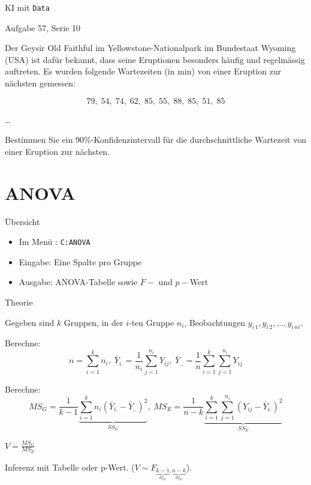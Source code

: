 \documentclass[handout]{beamer}
\newlength{\tikey}
\newcommand{\keystroke}[1]{\settowidth{\tikey}{\scriptsize #1}\psframebox[framearc=0.2]{\parbox{\tikey}{\scriptsize #1}}}
\begin{document}
\begin{frame}{KI mit \texttt{Data}}
\begin{beamerboxesrounded}[shadow]{Aufgabe 57, Serie 10}

Der Geysir Old Faithful im Yellowstone-Nationalpark im Bundestaat Wyoming (USA)
ist dafür bekannt, dass seine Eruptionen besonders häufig und regelmässig
auftreten. Es wurden folgende Wartezeiten (in min) von einer Eruption zur
nächsten gemessen:

$$
79,\; 54,\; 74,\; 62,\; 85,\; 55,\; 88,\; 85,\; 51,\; 85
$$

\begin{outline}
\item \dots
\item Bestimmen Sie ein 90\%-Konfidenzintervall für die durchschnittliche
Wartezeit von einer Eruption zur nächsten.
\end{outline}
\end{beamerboxesrounded}
\end{frame}

\section{ANOVA}
\begin{frame}{Übersicht}
\begin{itemize}
\item Im Menü \keystroke{F6}: \texttt{C:ANOVA}
\item Eingabe: Eine Spalte pro Gruppe
\item Ausgabe: ANOVA-Tabelle sowie $F-$ und $p-$Wert
\end{itemize}
\end{frame}

\begin{frame}{Theorie}
\begin{outline}
\item Gegeben sind $k$ Gruppen, in der $i$-ten Gruppe $n_i$, Beobachtungen
$y_{i\,1}, y_{i\,2}, \ldots, y_{i\,ni}$.
\item Berechne:
$$
n=\sum_{i=1}^k n_i,\;
\bar{Y}_{i.}=\frac{1}{n_i}\sum_{j=1}^{n_i}Y_{ij},\; 
\bar{Y}_{..}=\frac{1}{n}\sum_{i=1}^k\sum_{j=1}^{n_i}Y_{ij}
$$
\item Berechne:
$$
MS_G=\frac{1}{k-1}\underbrace{\sum_{i=1}^k n_i(\bar{Y}_{i.}-\bar{Y}_{..})^2}_{SS_G},\;
MS_E=\frac{1}{n-k}\underbrace{\sum_{i=1}^k\sum_{j=1}^{n_i}(Y_{ij}-\bar{Y}_{i.})^2}_{SS_E}
$$
\item $V=\frac{MS_G}{MS_E}$
\item Inferenz mit Tabelle oder p-Wert. ($V\sim F_{\underbrace{k-1}_{df_G},\underbrace{n-k}_{df_E}}$).
\end{outline}
\end{frame}
\end{document}
